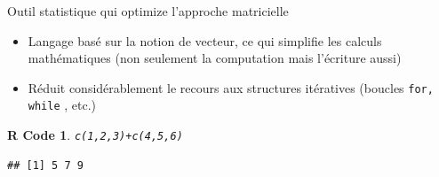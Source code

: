 \documentclass[11pt]{beamer}\usepackage[]{graphicx}\usepackage[]{color}
\makeatletter
\newcommand{\hlnum}[1]{\textcolor[rgb]{0.063,0.58,0.627}{#1}}%
\newcommand{\hlopt}[1]{\textcolor[rgb]{0.196,0.196,0.196}{#1}}%
\newcommand{\hlstd}[1]{\textcolor[rgb]{0.196,0.196,0.196}{#1}}%
\newcommand{\hlkwd}[1]{\textcolor[rgb]{0.78,0.227,0.412}{#1}}%
\newenvironment{kframe}{%
 \def\at@end@of@kframe{}%
 \ifinner\ifhmode%
  \def\at@end@of@kframe{\end{minipage}}%
  \begin{minipage}{\columnwidth}%
 \fi\fi%
 \def\FrameCommand##1{\hskip\@totalleftmargin \hskip-\fboxsep
 \colorbox{shadecolor}{##1}\hskip-\fboxsep
     \hskip-\linewidth \hskip-\@totalleftmargin \hskip\columnwidth}%
 \MakeFramed {\advance\hsize-\width
   \@totalleftmargin\z@ \linewidth\hsize
   \@setminipage}}%
 {\par\unskip\endMakeFramed%
 \at@end@of@kframe}
\newenvironment{knitrout}{}{} %
\newtheorem{rcode}{R Code}[section]
\newcommand{\code}[1]{\texttt{#1}}
\makeatother
\begin{document}
\begin{frame}[fragile]{Outil statistique qui optimize l'approche matricielle}

\begin{itemize}
  \setlength\itemsep{2em}
\item Langage bas\'{e} sur la notion de vecteur, ce qui simplifie les calculs math\'{e}matiques (non seulement la computation mais l'écriture aussi)
\pause \item R\'{e}duit consid\'{e}rablement le recours aux structures it\'{e}ratives
(boucles \code{for, while} , etc.)
\end{itemize}
\pause 
\begin{knitrout}
\color{fgcolor}\begin{kframe}
\begin{rcode}\begin{alltt}
\hlkwd{c}\hlstd{(}\hlnum{1}\hlstd{,}\hlnum{2}\hlstd{,}\hlnum{3}\hlstd{)} \hlopt{+} \hlkwd{c}\hlstd{(}\hlnum{4}\hlstd{,}\hlnum{5}\hlstd{,}\hlnum{6}\hlstd{)}
\end{alltt}
\begin{verbatim}
## [1] 5 7 9
\end{verbatim}
\end{rcode}\end{kframe}
\end{knitrout}


\end{frame}
\end{document}
